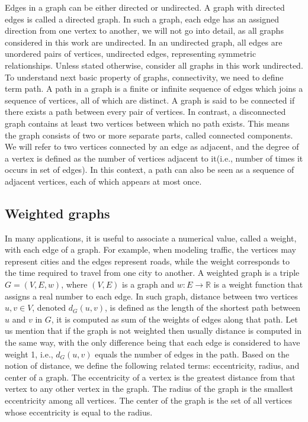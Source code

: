 \documentclass[12pt]{article}
\begin{document}
		Edges in a graph can be either directed or undirected. A graph with directed edges is called a directed graph. In such a graph, each edge has an assigned direction from one vertex to another, we will not go into detail, as all graphs considered in this work are undirected. In an undirected graph, all edges are unordered pairs of vertices, undirected edges, representing symmetric relationships. Unless stated otherwise, consider all graphs in this work undirected.
		To understand next basic property of graphs, connectivity, we need to define term path. A path in a graph is a finite or infinite sequence of edges which joins a sequence of vertices, all of which are distinct. A graph is said to be connected if there exists a path between every pair of vertices. In contrast, a disconnected graph contains at least two vertices between which no path exists. This means the graph consists of two or more separate parts, called connected components. 
		We will refer to two vertices connected by an edge as adjacent, and the degree of a vertex is defined as the number of vertices adjacent to it(i.e., number of times it occurs in set of edges). In this context, a path can also be seen as a sequence of adjacent vertices, each of which appears at most once.
	
	\subsection{Weighted graphs}	
		In many applications, it is useful to associate a numerical value, called a weight, with each edge of a graph. For example, when modeling traffic, the vertices may represent cities and the edges represent roads, while the weight corresponds to the time required to travel from one city to another. 
		A weighted graph is a triple \( G = (V, E, w) \), where \( (V, E) \) is a graph and \( w : E \to \mathbb{R} \) is a weight function that assigns a real number to each edge. 
		In such graph, distance between two vertices \( u, v \in V \), denoted \( d_G(u,v) \),  is defined as the length of the shortest path between \( u \) and \( v \) in \( G \), it is computed as sum of the weights of edges along that path. Let us mention that if the graph is not weighted then usually distance is computed in the same way, with the only difference being that each edge is considered to have weight 1, i.e., \( d_G(u,v) \) equals the number of edges in the path.
		Based on the notion of distance, we define the following related terms: eccentricity, radius, and center of a graph. The eccentricity of a vertex is the greatest distance from that vertex to any other vertex in the graph. The radius of the graph is the smallest eccentricity among all vertices. The center of the graph is the set of all vertices whose eccentricity is equal to the radius.
		
\end{document}
